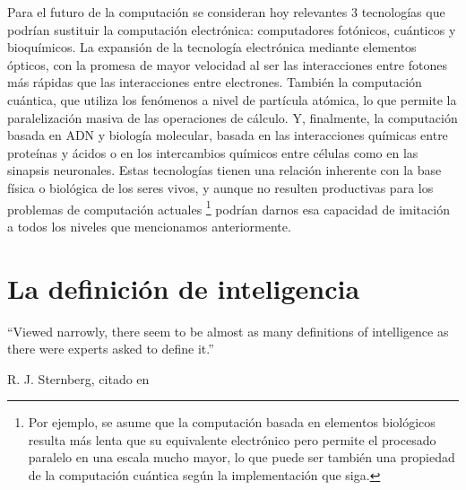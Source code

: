 \documentclass[12pt]{memoir}
\begin{document}
Para el futuro de la computación se consideran hoy relevantes 3 tecnologías que podrían sustituir la computación electrónica: computadores fotónicos, cuánticos y bioquímicos. La expansión de la tecnología electrónica mediante elementos ópticos, con la promesa de mayor velocidad al ser las interacciones entre fotones más rápidas que las interacciones entre electrones. También la computación cuántica, que utiliza los fenómenos a nivel de partícula atómica, lo que permite la paralelización masiva de las operaciones de cálculo. Y, finalmente, la computación basada en ADN y biología molecular, basada en las interacciones químicas entre proteínas y ácidos o en los intercambios químicos entre células como en las sinapsis neuronales. Estas tecnologías tienen una relación inherente con la base física o biológica de los seres vivos, y aunque no resulten productivas para los problemas de computación actuales \footnote{Por ejemplo, se asume que la computación basada en elementos biológicos resulta más lenta que su equivalente electrónico pero permite el procesado paralelo en una escala mucho mayor, lo que puede ser también una propiedad de la computación cuántica según la implementación que siga.} podrían darnos esa capacidad de imitación a todos los niveles que mencionamos anteriormente.


\chapter{La definición de inteligencia}
\label{intelligence}

\epigraph{``Viewed narrowly, there seem to be almost as many definitions of
intelligence as there were experts asked to define it.''}{R. J. Sternberg, citado en \cite{intDefs}}
\end{document}
